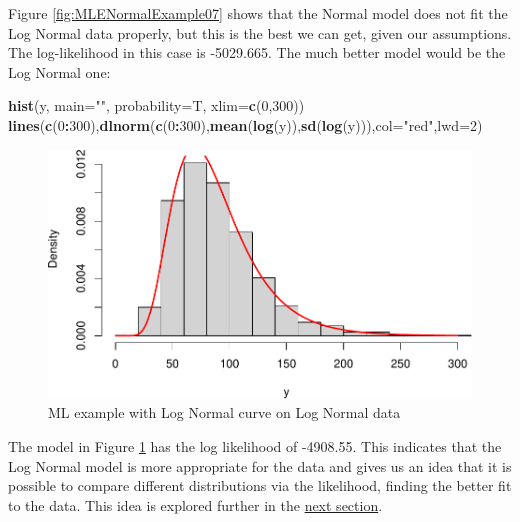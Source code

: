 \documentclass[
]{book}
\newenvironment{Shaded}{\begin{snugshade}}{\end{snugshade}}
\newcommand{\AttributeTok}[1]{\textcolor[rgb]{0.13,0.29,0.53}{#1}}
\newcommand{\DecValTok}[1]{\textcolor[rgb]{0.00,0.00,0.81}{#1}}
\newcommand{\FunctionTok}[1]{\textcolor[rgb]{0.13,0.29,0.53}{\textbf{#1}}}
\newcommand{\NormalTok}[1]{#1}
\newcommand{\SpecialCharTok}[1]{\textcolor[rgb]{0.81,0.36,0.00}{\textbf{#1}}}
\newcommand{\StringTok}[1]{\textcolor[rgb]{0.31,0.60,0.02}{#1}}
\theoremstyle{definition}
\theoremstyle{definition}
\theoremstyle{definition}
\theoremstyle{definition}
\theoremstyle{remark}
\begin{document}
Figure \ref{fig:MLENormalExample07} shows that the Normal model does not fit the Log Normal data properly, but this is the best we can get, given our assumptions. The log-likelihood in this case is -5029.665. The much better model would be the Log Normal one:

\begin{Shaded}
\begin{Highlighting}[]
\FunctionTok{hist}\NormalTok{(y, }\AttributeTok{main=}\StringTok{""}\NormalTok{, }\AttributeTok{probability=}\NormalTok{T, }\AttributeTok{xlim=}\FunctionTok{c}\NormalTok{(}\DecValTok{0}\NormalTok{,}\DecValTok{300}\NormalTok{))}
\FunctionTok{lines}\NormalTok{(}\FunctionTok{c}\NormalTok{(}\DecValTok{0}\SpecialCharTok{:}\DecValTok{300}\NormalTok{),}\FunctionTok{dlnorm}\NormalTok{(}\FunctionTok{c}\NormalTok{(}\DecValTok{0}\SpecialCharTok{:}\DecValTok{300}\NormalTok{),}\FunctionTok{mean}\NormalTok{(}\FunctionTok{log}\NormalTok{(y)),}\FunctionTok{sd}\NormalTok{(}\FunctionTok{log}\NormalTok{(y))),}\AttributeTok{col=}\StringTok{"red"}\NormalTok{,}\AttributeTok{lwd=}\DecValTok{2}\NormalTok{)}
\end{Highlighting}
\end{Shaded}

\begin{figure}
\centering
\includegraphics{Svetunkov---Statistics-for-Business-Analytics_files/figure-latex/MLENormalExample08-1.pdf}
\caption{\label{fig:MLENormalExample08}ML example with Log Normal curve on Log Normal data}
\end{figure}

The model in Figure \ref{fig:MLENormalExample08} has the log likelihood of -4908.55. This indicates that the Log Normal model is more appropriate for the data and gives us an idea that it is possible to compare different distributions via the likelihood, finding the better fit to the data. This idea is explored further in the \hyperref[modelSelection]{next section}.
\end{document}
